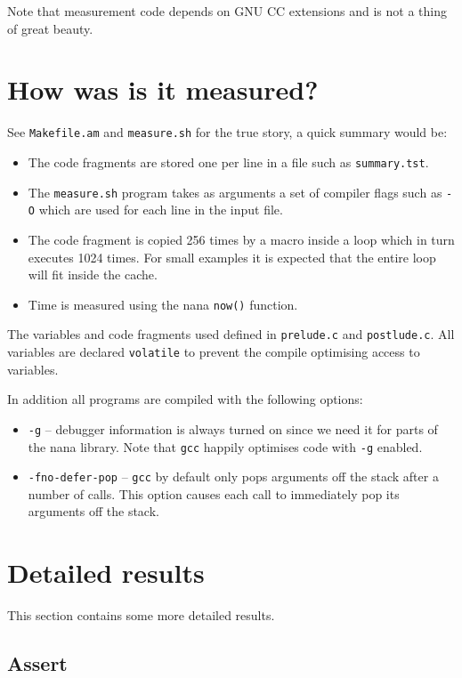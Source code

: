 \documentclass[a4paper]{article}
\begin{document}
Note that measurement code depends on GNU CC extensions and is not
a thing of great beauty. 

\section{How was is it measured?}

See \verb|Makefile.am| and \verb|measure.sh| for the true story, a
quick summary would be:

\begin{itemize}
\item The code fragments are stored one per line in a file such 
  as \verb|summary.tst|. 
\item The \verb|measure.sh| program takes as arguments a set of
  compiler flags such as \verb|-O| which are used for each line
  in the input file.
\item The code fragment is copied 256 times by a macro inside a 
  loop which in turn executes 1024 times. For small examples 
  it is expected that the entire loop will fit inside the cache.
\item Time is measured using the nana \verb|now()| function.
\end{itemize}

The variables and code fragments used defined in \verb|prelude.c|
and \verb|postlude.c|. All variables are declared \verb|volatile|
to prevent the compile optimising access to variables.

In addition all programs are compiled with the following options:

\begin{itemize}
\item \verb|-g| -- debugger information is always turned on since we
  need it for parts of the nana library. Note that \verb|gcc| happily 
  optimises code with \verb|-g| enabled.
\item \verb|-fno-defer-pop| -- \verb|gcc| by default only pops
  arguments off the stack after a number of calls. This option 
  causes each call to immediately pop its arguments off the stack.
\end{itemize}

\section{Detailed results}
This section contains some more detailed results.

\subsection{Assert}

\end{document}
